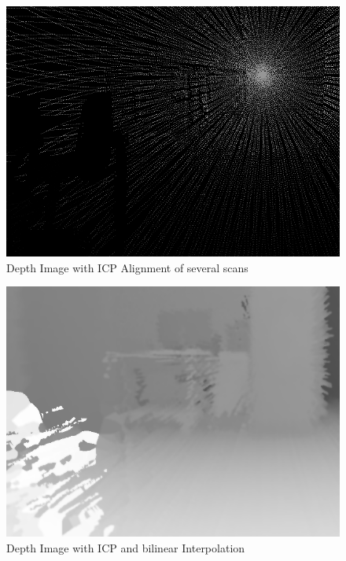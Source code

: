 \documentclass[english, bachelor, utf8]{base/thesis_telematics}
\begin{document}
\begin{figure}[ht!]
    \centering
    \includegraphics[width=\linewidth]{pics/depth_icp_robohall.png}
    \caption{Depth Image with ICP Alignment of several scans}
    \label{fig:icp_depth}
\end{figure}

\begin{figure}[ht!]
    \centering
    \includegraphics[width=\linewidth]{pics/depth_filled_robohall.png}
    \caption{Depth Image with ICP and bilinear Interpolation}
    \label{fig:icp_filled_depth}
\end{figure}
\end{document}
